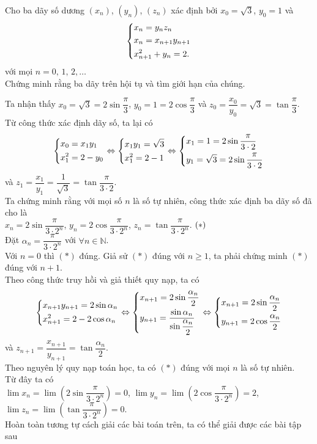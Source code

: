 \begin{bt}%
Cho ba dãy số dương $\left(x_n\right)$, $\left(y_n\right)$, $\left(z_n\right)$ xác định bởi $x_0=\sqrt{3}$, $y_0=1$ và 
$$\left\{\begin{aligned}& x_n=y_nz_n \\ & x_n=x_{n+1}y_{n+1}\\&x^2_{n+1}+y_n=2.\end{aligned}\right.$$
với mọi $n=0,\, 1,\, 2,\ldots$\\
Chứng minh rằng ba dãy trên hội tụ và tìm giới hạn của chúng.
	\loigiai
	{
	Ta nhận thấy $x_0=\sqrt{3}=2\sin \dfrac{\pi}{3}$, $y_0=1=2\cos \dfrac{\pi}{3}$ và $z_0=\dfrac{x_0}{y_0}=\sqrt{3}=\tan \dfrac{\pi}{3}$.\\
	Từ công thức xác định dãy số, ta lại có
	$$\left\{\begin{aligned}& x_0=x_1y_1 \\ & x^2_1=2-y_0\end{aligned}\right.\Leftrightarrow \left\{\begin{aligned}& x_1y_1=\sqrt{3} \\ & x^2_1=2-1\end{aligned}\right.\Leftrightarrow \left\{\begin{aligned}&x_1=1=2\sin \dfrac{\pi}{3\cdot 2}\\&y_1=\sqrt{3}=2\sin \dfrac{\pi}{3\cdot 2}\end{aligned}\right.$$
	và $z_1=\dfrac{x_1}{y_1}=\dfrac{1}{\sqrt{3}}=\tan \dfrac{\pi}{3\cdot 2}$.\\
	Ta chứng minh rằng với mọi số $n$ là số tự nhiên, công thức xác định ba dãy số đã cho là \\
	$x_n=2\sin \dfrac{\pi}{3\cdot 2^n}$, $y_n=2\cos \dfrac{\pi}{3\cdot 2^n}$, $z_n=\tan \dfrac{\pi}{3\cdot 2^n}$. $\hfill (\ast)$\\
	Đặt $\alpha_n=\dfrac{\pi}{3\cdot 2^n}$ với $\forall n\in\mathbb{N}$.\\
	Với $n=0$ thì $(\ast)$ đúng. Giả sử $(\ast)$ đúng với $n\geq 1$, ta phải chứng minh $(\ast)$ đúng với $n+1$.\\
	Theo công thức truy hồi và giả thiết quy nạp, ta có
	$$\left\{\begin{aligned}& x_{n+1}y_{n+1}=2\sin \alpha_n \\ & x^2_{n+1}=2-2\cos \alpha_n\end{aligned}\right.\Leftrightarrow \left\{\begin{aligned}& x_{n+1}=2\sin \dfrac{\alpha_n}{2} \\ & y_{n+1}=\dfrac{\sin \alpha_n}{\sin \dfrac{\alpha_n}{2}}\end{aligned}\right.\Leftrightarrow \left\{\begin{aligned}& x_{n+1}=2\sin \dfrac{\alpha_n}{2} \\ & y_{n+1}=2\cos \dfrac{\alpha_n}{2}\end{aligned}\right.$$
	và $z_{n+1}=\dfrac{x_{n+1}}{y_{n+1}}=\tan \dfrac{\alpha_n}{2}$.\\
	Theo nguyên lý quy nạp toán học, ta có $(\ast)$ đúng với mọi $n$ là số tự nhiên.\\
	Từ đây ta có\\ $\lim\limits x_n=\lim\limits \left(2\sin\dfrac{\pi}{3\cdot 2^n}\right)=0$, $\lim\limits y_n=\lim\limits \left(2\cos \dfrac{\pi}{3\cdot 2^n}\right)=2$, $\lim\limits z_n=\lim\limits \left(\tan \dfrac{\pi}{3\cdot 2^n}\right)=0$.\\
	Hoàn toàn tương tự cách giải các bài toán trên, ta có thể giải được các bài tập sau
	
	}
\end{bt}

